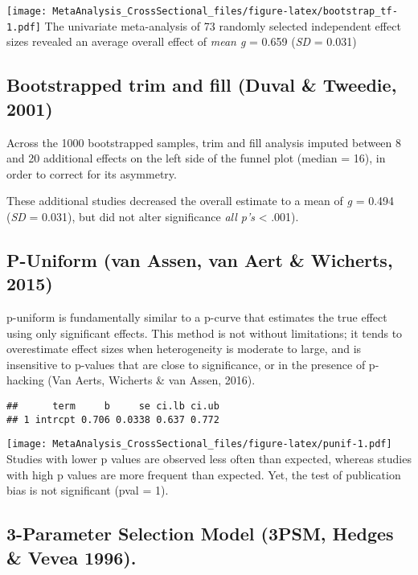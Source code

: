 \documentclass[
]{book}
\begin{document}
\texttt{[image: MetaAnalysis\_CrossSectional\_files/figure-latex/bootstrap\_tf-1.pdf]}
The univariate meta-analysis of 73 randomly selected independent effect sizes revealed
an average overall effect of \emph{mean g} = 0.659
(\emph{SD} = 0.031)

\hypertarget{bootstrapped-trim-and-fill-duval-tweedie-2001}{%
\subsection{Bootstrapped trim and fill (Duval \& Tweedie, 2001)}\label{bootstrapped-trim-and-fill-duval-tweedie-2001}}

Across the 1000 bootstrapped samples, trim and fill analysis imputed between
8 and 20 additional effects
on the left side of the funnel plot (median = 16), in order
to correct for its asymmetry.

These additional studies decreased the overall estimate to a mean of \emph{g} = 0.494
(\emph{SD} = 0.031), but did not alter significance \emph{all p's} \textless{} .001).

\hypertarget{p-uniform-van-assen-van-aert-wicherts-2015}{%
\subsection{P-Uniform (van Assen, van Aert \& Wicherts, 2015)}\label{p-uniform-van-assen-van-aert-wicherts-2015}}

p-uniform is fundamentally similar to a p-curve that estimates the true effect
using only significant effects. This method is not without limitations; it tends
to overestimate effect sizes when heterogeneity is moderate to large, and is
insensitive to p-values that are close to significance, or in the presence of
p-hacking (Van Aerts, Wicherts \& van Assen, 2016).

\begin{verbatim}
##      term     b     se ci.lb ci.ub
## 1 intrcpt 0.706 0.0338 0.637 0.772
\end{verbatim}

\texttt{[image: MetaAnalysis\_CrossSectional\_files/figure-latex/punif-1.pdf]}
Studies with lower p values are observed less often than expected, whereas studies with high p values
are more frequent than expected. Yet, the test of publication bias is not significant (pval = 1).

\hypertarget{parameter-selection-model-3psm-hedges-vevea-1996.}{%
\subsection{3-Parameter Selection Model (3PSM, Hedges \& Vevea 1996).}\label{parameter-selection-model-3psm-hedges-vevea-1996.}}
\end{document}
